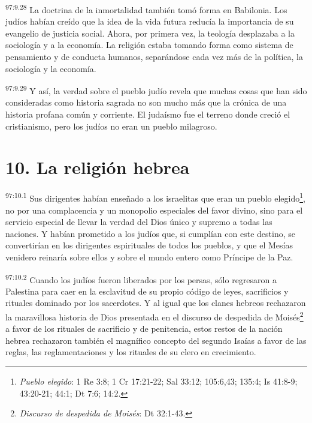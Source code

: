 \par
\textsuperscript{97:9.28} La doctrina de la inmortalidad también tomó forma en Babilonia. Los judíos habían creído que la idea de la vida futura reducía la importancia de su evangelio de justicia social. Ahora, por primera vez, la teología desplazaba a la sociología y a la economía. La religión estaba tomando forma como sistema de pensamiento y de conducta humanos, separándose cada vez más de la política, la sociología y la economía.

\par
\textsuperscript{97:9.29} Y así, la verdad sobre el pueblo judío revela que muchas cosas que han sido consideradas como historia sagrada no son mucho más que la crónica de una historia profana común y corriente. El judaísmo fue el terreno donde creció el cristianismo, pero los judíos no eran un pueblo milagroso.

\section*{10. La religión hebrea}
\par
\textsuperscript{97:10.1} Sus dirigentes habían enseñado a los israelitas que eran un pueblo elegido\footnote{\textit{Pueblo elegido}: 1 Re 3:8; 1 Cr 17:21-22; Sal 33:12; 105:6,43; 135:4; Is 41:8-9; 43:20-21; 44:1; Dt 7:6; 14:2.}, no por una complacencia y un monopolio especiales del favor divino, sino para el servicio especial de llevar la verdad del Dios único y supremo a todas las naciones. Y habían prometido a los judíos que, si cumplían con este destino, se convertirían en los dirigentes espirituales de todos los pueblos, y que el Mesías venidero reinaría sobre ellos y sobre el mundo entero como Príncipe de la Paz.

\par
\textsuperscript{97:10.2} Cuando los judíos fueron liberados por los persas, sólo regresaron a Palestina para caer en la esclavitud de su propio código de leyes, sacrificios y rituales dominado por los sacerdotes. Y al igual que los clanes hebreos rechazaron la maravillosa historia de Dios presentada en el discurso de despedida de Moisés\footnote{\textit{Discurso de despedida de Moisés}: Dt 32:1-43.} a favor de los rituales de sacrificio y de penitencia, estos restos de la nación hebrea rechazaron también el magnífico concepto del segundo Isaías a favor de las reglas, las reglamentaciones y los rituales de su clero en crecimiento.

